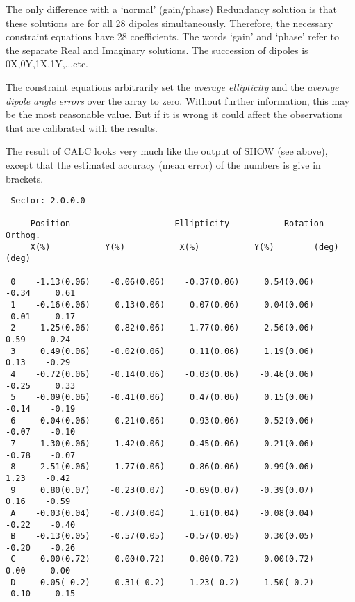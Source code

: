 The only difference with a `normal' (gain/phase) Redundancy solution is that
these solutions are for all 28 dipoles simultaneously. Therefore, the necessary
constraint equations have 28 coefficients. The words `gain' and `phase' refer
to the separate Real and Imaginary solutions. The succession of dipoles is
0X,0Y,1X,1Y,...etc.

The constraint equations arbitrarily set the {\em average ellipticity} and the
{\em average dipole angle errors} over the array to zero. Without further
information, this may be the most reasonable value. But if it is wrong it could
affect the observations that are calibrated with the results.

The result of CALC looks very much like the output of SHOW (see above), except
that the estimated accuracy (mean error) of the numbers is give in brackets.

%
\spbegin %
\svbegin \begin{verbatim}
 Sector: 2.0.0.0

	 Position                     Ellipticity           Rotation Orthog.
	 X(%)           Y(%)           X(%)           Y(%)        (deg)    (deg)

 0    -1.13(0.06)    -0.06(0.06)    -0.37(0.06)     0.54(0.06)    -0.34     0.61
 1    -0.16(0.06)     0.13(0.06)     0.07(0.06)     0.04(0.06)    -0.01     0.17
 2     1.25(0.06)     0.82(0.06)     1.77(0.06)    -2.56(0.06)     0.59    -0.24
 3     0.49(0.06)    -0.02(0.06)     0.11(0.06)     1.19(0.06)     0.13    -0.29
 4    -0.72(0.06)    -0.14(0.06)    -0.03(0.06)    -0.46(0.06)    -0.25     0.33
 5    -0.09(0.06)    -0.41(0.06)     0.47(0.06)     0.15(0.06)    -0.14    -0.19
 6    -0.04(0.06)    -0.21(0.06)    -0.93(0.06)     0.52(0.06)    -0.07    -0.10
 7    -1.30(0.06)    -1.42(0.06)     0.45(0.06)    -0.21(0.06)    -0.78    -0.07
 8     2.51(0.06)     1.77(0.06)     0.86(0.06)     0.99(0.06)     1.23    -0.42
 9     0.80(0.07)    -0.23(0.07)    -0.69(0.07)    -0.39(0.07)     0.16    -0.59
 A    -0.03(0.04)    -0.73(0.04)     1.61(0.04)    -0.08(0.04)    -0.22    -0.40
 B    -0.13(0.05)    -0.57(0.05)    -0.57(0.05)     0.30(0.05)    -0.20    -0.26
 C     0.00(0.72)     0.00(0.72)     0.00(0.72)     0.00(0.72)     0.00     0.00
 D    -0.05( 0.2)    -0.31( 0.2)    -1.23( 0.2)     1.50( 0.2)    -0.10    -0.15
\end{verbatim}\svend
\spend %

